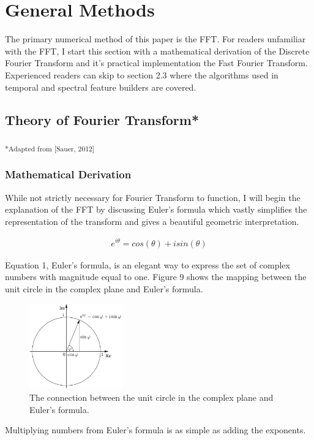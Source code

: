 \documentclass[DIV=calc, paper=a4, fontsize=11pt, twocolumn]{scrartcl}   %
\begin{document}
\section{General Methods}
The primary numerical method of this paper is the FFT. For readers unfamiliar with the FFT, I start this section with a mathematical derivation of the Discrete Fourier Transform and it's practical implementation the Fast Fourier Transform. Experienced readers can skip to section 2.3 where the algorithms used in temporal and spectral feature builders are covered.
\subsection{Theory of Fourier Transform*}
\textsubscript{*Adapted from [Sauer, 2012]}
\subsubsection{Mathematical Derivation}

While not strictly necessary for Fourier Transform to function, I will begin the explanation of the FFT by discussing Euler's formula which vastly simplifies the representation of the transform and gives a beautiful geometric interpretation.

\begin{align}
e^{i\theta} = cos(\theta) + isin(\theta)
\end{align}

Equation 1, Euler's formula, is an elegant way to express the set of complex numbers with magnitude equal to one. Figure 9 shows the mapping between the unit circle in the complex plane and Euler's formula.

\begin{figure}[h]
\centering
\includegraphics[width=40mm]{figures/EulersFormula.png}
\caption{The connection between the unit circle in the complex plane and Euler's formula. }
\label{overflow}
\end{figure}


Multiplying numbers from Euler's formula is as simple as adding the exponents.
\end{document}
